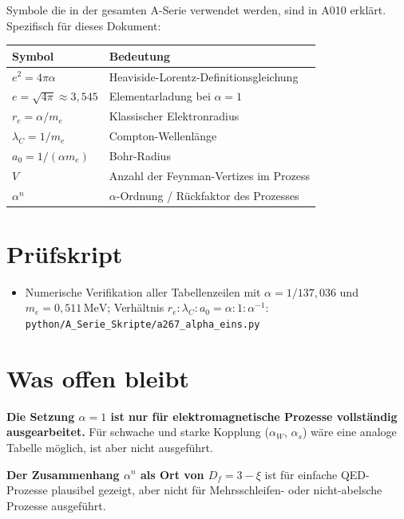 Symbole die in der gesamten A-Serie verwendet werden, sind in A010 erklärt.
Spezifisch für dieses Dokument:

\begin{center}
\renewcommand{\arraystretch}{1.3}
{\small\begin{tabular}{lp{9cm}}
\toprule
Symbol & Bedeutung \\
\midrule
$e^2 = 4\pi\alpha$ & Heaviside-Lorentz-Definitionsgleichung \\
$e = \sqrt{4\pi}\approx3{,}545$ & Elementarladung bei $\alpha=1$ \\
$r_e = \alpha/m_e$ & Klassischer Elektronradius \\
$\lambda_C = 1/m_e$ & Compton-Wellenlänge \\
$a_0 = 1/(\alpha m_e)$ & Bohr-Radius \\
$V$ & Anzahl der Feynman-Vertizes im Prozess \\
$\alpha^n$ & $\alpha$-Ordnung / Rückfaktor des Prozesses \\
\bottomrule
\end{tabular}}
\renewcommand{\arraystretch}{1.0}
\end{center}

\section{Prüfskript}

\begin{itemize}[leftmargin=2em,itemsep=2pt,topsep=2pt]
  \item Numerische Verifikation aller Tabellenzeilen mit $\alpha=1/137{,}036$
    und $m_e=0{,}511\,\text{MeV}$; Verhältnis $r_e:\lambda_C:a_0=\alpha:1:\alpha^{-1}$:
    \texttt{python/A\_Serie\_Skripte/a267\_alpha\_eins.py}
\end{itemize}

\section{Was offen bleibt}

\textbf{Die Setzung $\alpha=1$ ist nur für elektromagnetische Prozesse
vollständig ausgearbeitet.} Für schwache und starke Kopplung ($\alpha_W$,
$\alpha_s$) wäre eine analoge Tabelle möglich, ist aber nicht ausgeführt.

\textbf{Der Zusammenhang $\alpha^n$ als Ort von $D_f=3-\xi$} ist für
einfache QED-Prozesse plausibel gezeigt, aber nicht für Mehrsschleifen-
oder nicht-abelsche Prozesse ausgeführt.

